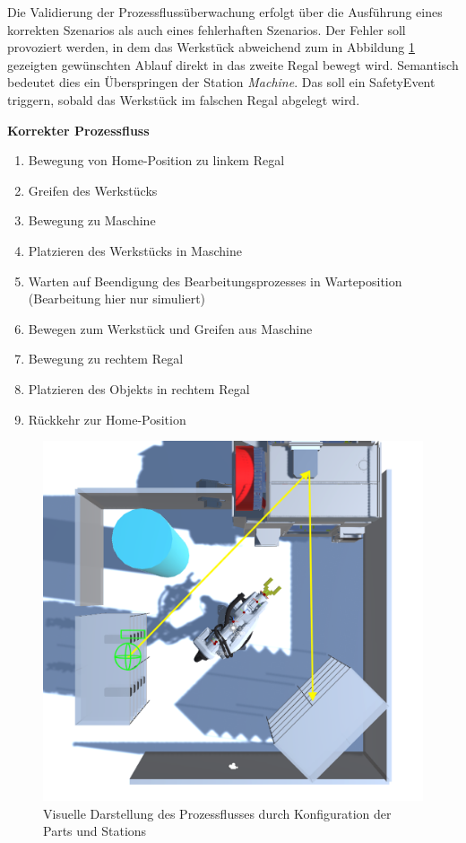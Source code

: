 Die Validierung der Prozessflussüberwachung erfolgt über die Ausführung eines
korrekten Szenarios als auch eines fehlerhaften Szenarios. Der Fehler soll
provoziert werden, in dem das Werkstück abweichend zum in Abbildung
\ref{figure:Prozessfluss} gezeigten gewünschten Ablauf direkt in das zweite
Regal bewegt wird. Semantisch bedeutet dies ein Überspringen der Station
\textit{Machine}. Das soll ein SafetyEvent triggern, sobald das Werkstück im
falschen Regal abgelegt wird.

\textbf{Korrekter Prozessfluss}
\begin{enumerate}
  \item Bewegung von Home-Position zu linkem Regal
  \item Greifen des Werkstücks
  \item Bewegung zu Maschine
  \item Platzieren des Werkstücks in Maschine
  \item Warten auf Beendigung des Bearbeitungsprozesses in
    Warteposition (Bearbeitung hier nur simuliert)
  \item Bewegen zum Werkstück und Greifen aus Maschine
  \item Bewegung zu rechtem Regal
  \item Platzieren des Objekts in rechtem Regal
  \item Rückkehr zur Home-Position
\end{enumerate}

\begin{figure}[H]
  \centering
  \includegraphics[width=0.7\linewidth]{Figures/Prozessfolge.png}
  \caption{Visuelle Darstellung des Prozessflusses durch Konfiguration der Parts
  und Stations}
  \label{figure:Prozessfluss}
\end{figure}

